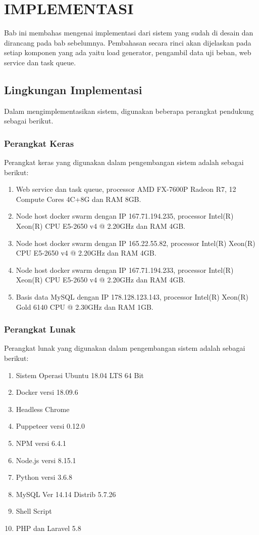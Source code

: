 \chapter{IMPLEMENTASI}
	Bab ini membahas mengenai implementasi dari sistem yang sudah di desain dan dirancang pada bab sebelumnya. Pembahasan secara rinci akan dijelaskan pada setiap komponen yang ada yaitu load generator, pengambil data uji beban, web service dan task queue.
	
	\section{Lingkungan Implementasi}
		Dalam mengimplementasikan sistem, digunakan beberapa perangkat pendukung sebagai berikut.
		
		\subsection{Perangkat Keras}
		Perangkat keras yang digunakan dalam pengembangan sistem adalah sebagai berikut:
		\begin{enumerate}
			\item Web service dan task queue, processor AMD FX-7600P Radeon R7, 12 Compute Cores 4C+8G dan RAM 8GB.
			\item Node host docker swarm dengan IP 167.71.194.235, processor Intel(R) Xeon(R) CPU E5-2650 v4 @ 2.20GHz dan RAM 4GB.
			\item Node host docker swarm dengan IP 165.22.55.82, processor Intel(R) Xeon(R) CPU E5-2650 v4 @ 2.20GHz dan RAM 4GB.
			\item Node host docker swarm dengan IP 167.71.194.233, processor Intel(R) Xeon(R) CPU E5-2650 v4 @ 2.20GHz dan RAM 4GB.
			\item Basis data MySQL dengan IP 178.128.123.143, processor Intel(R) Xeon(R) Gold 6140 CPU @ 2.30GHz dan RAM 1GB.
		\end{enumerate}
	
		\subsection{Perangkat Lunak}
		Perangkat lunak yang digunakan dalam pengembangan sistem adalah sebagai berikut:
		\begin{enumerate}
			\item Sistem Operasi Ubuntu 18.04 LTS 64 Bit
			\item Docker versi 18.09.6 
			\item Headless Chrome 
			\item Puppeteer versi 0.12.0
			\item NPM versi 6.4.1
			\item Node.js versi 8.15.1
			\item Python versi 3.6.8
			\item MySQL Ver 14.14 Distrib 5.7.26
			\item Shell Script
			\item PHP dan Laravel 5.8
		\end{enumerate}
		
